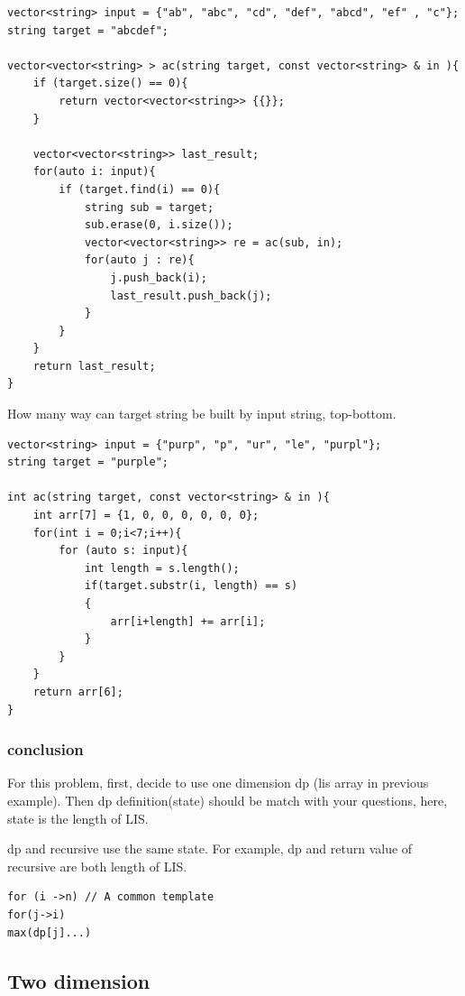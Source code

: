 \documentclass[a4paper,11pt,twoside]{book}
\begin{document}
\begin{lstlisting}[numbers=none]
vector<string> input = {"ab", "abc", "cd", "def", "abcd", "ef" , "c"};
string target = "abcdef";

vector<vector<string> > ac(string target, const vector<string> & in ){
	if (target.size() == 0){
		return vector<vector<string>> {{}};
	}
	
	vector<vector<string>> last_result;
	for(auto i: input){
		if (target.find(i) == 0){
			string sub = target;
			sub.erase(0, i.size());
			vector<vector<string>> re = ac(sub, in);
			for(auto j : re){
				j.push_back(i);
				last_result.push_back(j);
			}
		}
	}
	return last_result;
}	
\end{lstlisting} 	
	
	\par How many way can target string be built by input string, top-bottom.
\begin{lstlisting}[numbers=none]
vector<string> input = {"purp", "p", "ur", "le", "purpl"};
string target = "purple";

int ac(string target, const vector<string> & in ){	
	int arr[7] = {1, 0, 0, 0, 0, 0, 0};
	for(int i = 0;i<7;i++){
		for (auto s: input){
			int length = s.length();
			if(target.substr(i, length) == s)
			{
				arr[i+length] += arr[i];
			}		
		}
	}	
	return arr[6];
}	
\end{lstlisting} 	
	


\subsubsection{conclusion}

	\par For this problem, first, decide to use one dimension dp (lis array in previous example). Then dp definition(state) should be match with your questions, here, state is the length of LIS. 
	
	\par dp and recursive use the same state. For example, dp and return value of recursive are both length of LIS.
	
\begin{lstlisting}[numbers=none]
for (i ->n) // A common template
for(j->i)
max(dp[j]...)	
\end{lstlisting}	
	

\subsection{Two dimension}
\end{document}
